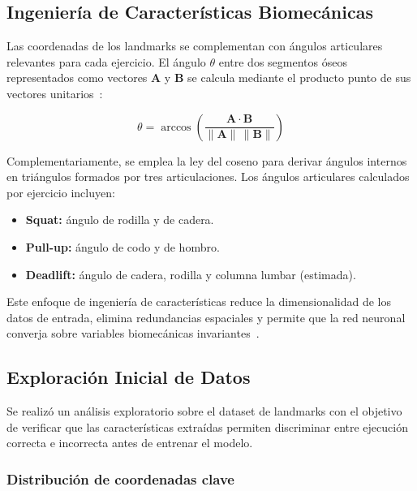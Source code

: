 \documentclass[conference]{IEEEtran}
\begin{document}
\subsection{Ingeniería de Características Biomecánicas}

Las coordenadas de los landmarks se complementan con ángulos
articulares relevantes para cada ejercicio. El ángulo $\theta$
entre dos segmentos óseos representados como vectores $\mathbf{A}$
y $\mathbf{B}$ se calcula mediante el producto punto de sus
vectores unitarios~\cite{winter2009biomechanics, zhou2019continuity}:

\begin{equation}
  \theta = \arccos\!\left(\frac{\mathbf{A} \cdot \mathbf{B}}
           {\|\mathbf{A}\| \, \|\mathbf{B}\|}\right)
  \label{eq:angle}
\end{equation}

Complementariamente, se emplea la ley del coseno para derivar
ángulos internos en triángulos formados por tres articulaciones.
Los ángulos articulares calculados por ejercicio incluyen:

\begin{itemize}
  \item \textbf{Squat:} ángulo de rodilla y de cadera.
  \item \textbf{Pull-up:} ángulo de codo y de hombro.
  \item \textbf{Deadlift:} ángulo de cadera, rodilla y columna
        lumbar (estimada).
\end{itemize}

Este enfoque de ingeniería de características reduce la
dimensionalidad de los datos de entrada, elimina redundancias
espaciales y permite que la red neuronal converja sobre variables
biomecánicas invariantes~\cite{zhou2019continuity}.

\subsection{Exploración Inicial de Datos}
\label{subsec:exploration}

Se realizó un análisis exploratorio sobre el dataset de landmarks
con el objetivo de verificar que las características extraídas
permiten discriminar entre ejecución correcta e incorrecta antes
de entrenar el modelo.

\subsubsection{Distribución de coordenadas clave}
\end{document}
